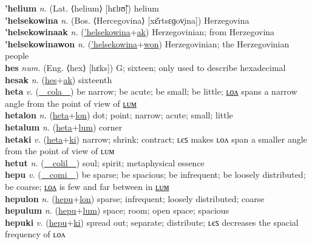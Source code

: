 \textbf{'helium} \textit{n.} (Lat. ⟨helium⟩ [hɛlɪʊ̃])
helium \label{'helium} \\
\textbf{'helsekowina} \textit{n.} (Bos. ⟨Hercegovina⟩ [xɛ̌rtsɛɡov̞ina])
Herzegovina \label{'helsekowina} \\
\textbf{'helsekowinaak} \textit{n.} (\hyperref['helsekowina]{'helsekowina}+\hyperref[ak]{ak})
Herzegovinian; from Herzegovina \label{'helsekowinaak} \\
\textbf{'helsekowinawon} \textit{n.} (\hyperref['helsekowina]{'helsekowina}+\hyperref[won]{won})
Herzegovinian; the Herzegovinian people \label{'helsekowinawon} \\
\textbf{hes} \textit{num.} (Eng. ⟨hex⟩ [hɛks])
G; sixteen; only used to describe hexadecimal \label{hes} \\
\textbf{hesak} \textit{n.} (\hyperref[hes]{hes}+\hyperref[ak]{ak})
sixteenth \label{hesak} \\
\textbf{heta} \textit{v.} (\hyperref[cola]{~~cola~~})
be narrow; be acute; be small; be little; \hyperref[hetalon]{ʟᴏᴧ} spans a narrow angle from the point of view of \hyperref[hetalum]{ʟᴜᴍ} \label{heta} \\
\textbf{hetalon} \textit{n.} (\hyperref[heta]{heta}+\hyperref[lon]{lon})
dot; point; narrow; acute; small; little \label{hetalon} \\
\textbf{hetalum} \textit{n.} (\hyperref[heta]{heta}+\hyperref[lum]{lum})
corner \label{hetalum} \\
\textbf{hetaki} \textit{v.} (\hyperref[heta]{heta}+\hyperref[ki]{ki})
narrow; shrink; contract; ʟєꜱ makes ʟᴏᴧ span a smaller angle from the point of view of ʟᴜᴍ \label{hetaki} \\
\textbf{hetut} \textit{n.} (\hyperref[colil]{~~colil~~})
soul; spirit; metaphysical essence \label{hetut} \\
\textbf{hepu} \textit{v.} (\hyperref[comi]{~~comi~~})
be sparse; be spacious; be infrequent; be loosely distributed; be coarse; \hyperref[hepulon]{ʟᴏᴧ} is few and far between in \hyperref[hepulum]{ʟᴜᴍ} \label{hepu} \\
\textbf{hepulon} \textit{n.} (\hyperref[hepu]{hepu}+\hyperref[lon]{lon})
sparse; infrequent; loosely distributed; coarse \label{hepulon} \\
\textbf{hepulum} \textit{n.} (\hyperref[hepu]{hepu}+\hyperref[lum]{lum})
space; room; open space; spacious \label{hepulum} \\
\textbf{hepuki} \textit{v.} (\hyperref[hepu]{hepu}+\hyperref[ki]{ki})
spread out; separate; distribute; ʟєꜱ decreases the spacial frequency of ʟᴏᴧ \label{hepuki} \\
